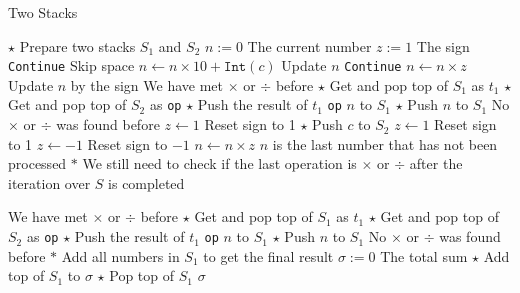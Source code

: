 \setcounter{algorithm}{0}
\begin{algorithm}[H]
\caption{Two Stacks}
\begin{algorithmic}[1]
\State $\star$ Prepare two stacks $S_1$ and $S_2$
\State $n:=0$ \Comment The current number
\State $z:=1$ \Comment The sign
\State \texttt{Continue} \Comment Skip space
\EndIf
{}
\State $n\gets n\times 10 + \texttt{Int}(c)$ \Comment Update $n$
\State \texttt{Continue}
\EndIf
\State $n\gets n\times z$ \Comment Update $n$ by the sign
 \Comment We have met $\times$ or $\div$ before
\State $\star$ Get and pop top of $S_1$ as $t_1$
\State $\star$ Get and pop top of $S_2$ as \texttt{op}
\State $\star$ Push the result of $t_1$ \texttt{op} $n$ to $S_1$
\Else
\State $\star$ Push $n$ to $S_1$ \Comment No $\times$ or $\div$ was found before
\EndIf
{}
\State $z\gets 1$ \Comment Reset sign to 1
\State $\star$ Push $c$ to $S_2$
\State $z\gets 1$ \Comment Reset sign to 1
\State $z\gets -1$ \Comment Reset sign to $-1$
\EndIf
\EndFor
\State $n\gets n\times z$ \Comment $n$ is the last number that has not been processed
\State $\ast$ We still need to check if the last operation is $\times$ or $\div$ after the iteration over $S$ is completed
\end{algorithmic}
\end{algorithm}
\begin{algorithm}[H]
\begin{algorithmic}[1]
 \Comment We have met $\times$ or $\div$ before
\State $\star$ Get and pop top of $S_1$ as $t_1$
\State $\star$ Get and pop top of $S_2$ as \texttt{op}
\State $\star$ Push the result of $t_1$ \texttt{op} $n$ to $S_1$
\Else
\State $\star$ Push $n$ to $S_1$ \Comment No $\times$ or $\div$ was found before
\EndIf
\State $\ast$ Add all numbers in $S_1$ to get the final result
\State $\sigma:=0$ \Comment The total sum
\State $\star$ Add top of $S_1$ to $\sigma$
\State $\star$ Pop top of $S_1$
\EndWhile
\State \Return $\sigma$
\EndProcedure
\end{algorithmic}
\end{algorithm}
\setcounter{lstlisting}{0}
